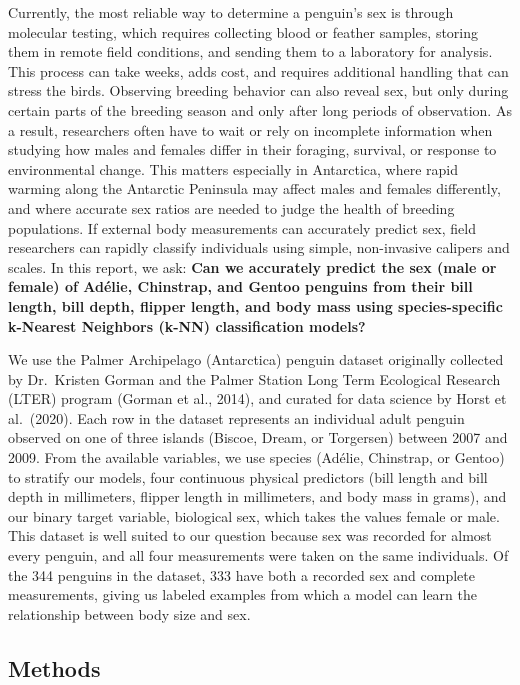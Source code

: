 \documentclass[
  letterpaper,
  DIV=11,
  numbers=noendperiod]{scrartcl}
\begin{document}
Currently, the most reliable way to determine a penguin's sex is through
molecular testing, which requires collecting blood or feather samples,
storing them in remote field conditions, and sending them to a
laboratory for analysis. This process can take weeks, adds cost, and
requires additional handling that can stress the birds. Observing
breeding behavior can also reveal sex, but only during certain parts of
the breeding season and only after long periods of observation. As a
result, researchers often have to wait or rely on incomplete information
when studying how males and females differ in their foraging, survival,
or response to environmental change. This matters especially in
Antarctica, where rapid warming along the Antarctic Peninsula may affect
males and females differently, and where accurate sex ratios are needed
to judge the health of breeding populations. If external body
measurements can accurately predict sex, field researchers can rapidly
classify individuals using simple, non-invasive calipers and scales. In
this report, we ask: \textbf{Can we accurately predict the sex (male or
female) of Adélie, Chinstrap, and Gentoo penguins from their bill
length, bill depth, flipper length, and body mass using species-specific
k-Nearest Neighbors (k-NN) classification models?}

We use the Palmer Archipelago (Antarctica) penguin dataset originally
collected by Dr.~Kristen Gorman and the Palmer Station Long Term
Ecological Research (LTER) program (Gorman et al., 2014), and curated
for data science by Horst et al.~(2020). Each row in the dataset
represents an individual adult penguin observed on one of three islands
(Biscoe, Dream, or Torgersen) between 2007 and 2009. From the available
variables, we use species (Adélie, Chinstrap, or Gentoo) to stratify our
models, four continuous physical predictors (bill length and bill depth
in millimeters, flipper length in millimeters, and body mass in grams),
and our binary target variable, biological sex, which takes the values
female or male. This dataset is well suited to our question because sex
was recorded for almost every penguin, and all four measurements were
taken on the same individuals. Of the 344 penguins in the dataset, 333
have both a recorded sex and complete measurements, giving us labeled
examples from which a model can learn the relationship between body size
and sex.

\subsection{Methods}\label{methods}
\end{document}
